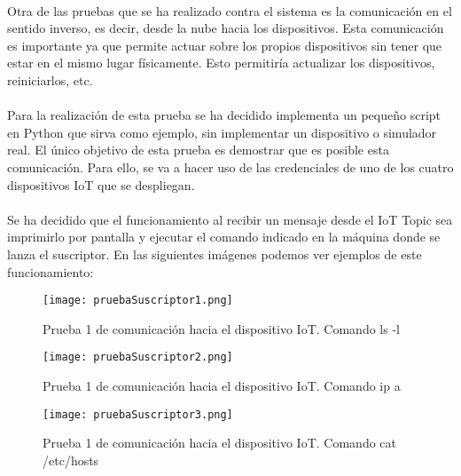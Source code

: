 \documentclass[../../memoria.tex]{subfiles}
\begin{document}
\paragraph{}
Otra de las pruebas que se ha realizado contra el sistema es la comunicación en el sentido inverso, es decir, desde la nube hacia los dispositivos. Esta comunicación es importante ya que permite actuar sobre los propios dispositivos sin tener que estar en el mismo lugar físicamente. Esto permitiría actualizar los dispositivos, reiniciarlos, etc.

\paragraph{}
Para la realización de esta prueba se ha decidido implementa un pequeño script en Python que sirva como ejemplo, sin implementar un dispositivo o simulador real. El único objetivo de esta prueba es demostrar que es posible esta comunicación. Para ello, se va a hacer uso de las credenciales de uno de los cuatro dispositivos IoT que se despliegan.

\paragraph{}
Se ha decidido que el funcionamiento al recibir un mensaje desde el IoT Topic sea imprimirlo por pantalla y ejecutar el comando indicado en la máquina donde se lanza el suscriptor. En las siguientes imágenes podemos ver ejemplos de este funcionamiento:

\begin{figure}[H]
    \centering
    \texttt{[image: pruebaSuscriptor1.png]}
    \caption{Prueba 1 de comunicación hacia el dispositivo IoT. Comando ls -l}
    \label{fig:pruebaSuscriptor1}
\end{figure}

\begin{figure}[H]
    \centering
    \texttt{[image: pruebaSuscriptor2.png]}
    \caption{Prueba 1 de comunicación hacia el dispositivo IoT. Comando ip a}
    \label{fig:pruebaSuscriptor2}
\end{figure}

\begin{figure}[H]
    \centering
    \texttt{[image: pruebaSuscriptor3.png]}
    \caption{Prueba 1 de comunicación hacia el dispositivo IoT. Comando cat /etc/hosts}
    \label{fig:pruebaSuscriptor3}
\end{figure}
\end{document}
